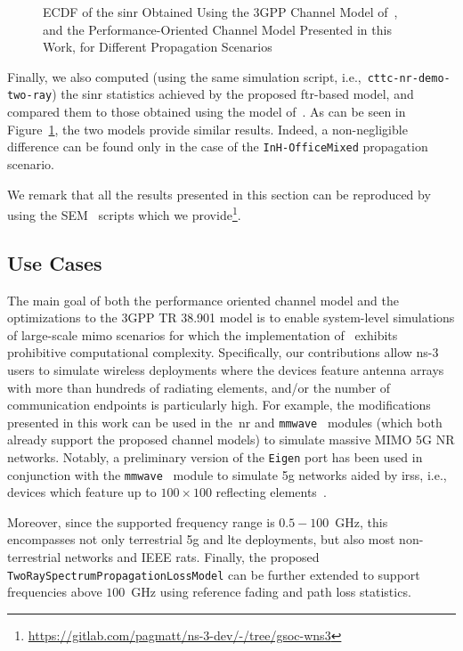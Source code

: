 \begin{figure}
    \centering 
    \setlength{}
    \setlength{}
    
    \caption{ECDF of the \gls{sinr} Obtained Using the 3GPP Channel Model of~\cite{TR38901}, and the Performance-Oriented Channel Model Presented in this Work, for Different Propagation Scenarios}
    \label{fig:accuracy}
\end{figure}

Finally, we also computed (using the same simulation script, i.e.,~\texttt{cttc-\-nr-\-demo-\-two-\-ray}) the \gls{sinr} statistics achieved by the proposed \gls{ftr}-based model, and compared them to those obtained using the model of~\cite{tommaso:20}. As can be seen in Figure~\ref{fig:accuracy}, the two models provide similar results. Indeed, a non-negligible difference can be found only in the case of the \texttt{InH-OfficeMixed} propagation scenario.

We remark that all the results presented in this section can be reproduced by using the SEM~\cite{magrin2019simulation} scripts which we provide\footnote{\url{https://gitlab.com/pagmatt/ns-3-dev/-/tree/gsoc-wns3}}.

\subsection{Use Cases}

The main goal of both the performance oriented channel model and the optimizations to the 3GPP TR 38.901 model is to enable system-level
simulations of large-scale \gls{mimo} scenarios for which the implementation of~\cite{tommaso:20} exhibits prohibitive computational complexity. Specifically, our contributions allow ns-3 users to simulate wireless deployments where the devices feature antenna arrays with more than hundreds of radiating elements, and/or the number of communication endpoints is particularly high. For example, the modifications presented in this work can be used in the~\gls{nr} and \texttt{mmwave}~\cite{mezzavilla2018end} modules (which both already support the proposed channel models) to simulate massive MIMO 5G NR networks. 
Notably, a preliminary version of the \texttt{Eigen} port has been used in conjunction with the \texttt{mmwave}~\cite{mezzavilla2018end} module to simulate \gls{5g} networks aided by \glspl{irs}, i.e., devices which feature up to $100 \times 100$ reflecting elements~\cite{pagin2022}. 

Moreover, since the supported frequency range is $0.5 - 100$~GHz, this encompasses not only terrestrial \gls{5g} and \gls{lte} deployments, but also most non-terrestrial networks and IEEE \glspl{rat}. Finally, the proposed \texttt{Two\-Ray\-Spectrum\-Propagation\-Loss\-Model} can be further extended to support frequencies above $100$~GHz using reference fading and path loss statistics.

